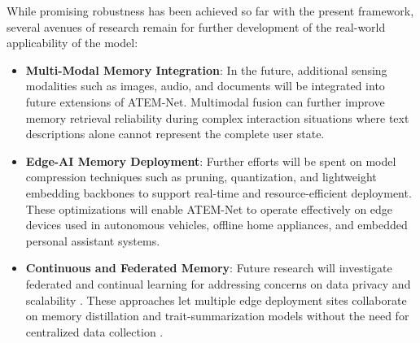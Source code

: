\documentclass[conference]{IEEEtran}
\begin{document}
While promising robustness has been achieved so far with the present framework, several avenues of research remain for further development of the real-world applicability of the model:
\begin{itemize}
    \item \textbf{Multi-Modal Memory Integration}: In the future, additional sensing modalities such as images, audio, and documents will be integrated into future extensions of ATEM-Net. Multimodal fusion can further improve memory retrieval reliability during complex interaction situations where text descriptions alone cannot represent the complete user state.
    \item \textbf{Edge-AI Memory Deployment}: Further efforts will be spent on model compression techniques such as pruning, quantization, and lightweight embedding backbones to support real-time and resource-efficient deployment. These optimizations will enable ATEM-Net to operate effectively on edge devices used in autonomous vehicles, offline home appliances, and embedded personal assistant systems.
    \item \textbf{Continuous and Federated Memory}: Future research will investigate federated and continual learning for addressing concerns on data privacy and scalability \cite{serra}. These approaches let multiple edge deployment sites collaborate on memory distillation and trait-summarization models without the need for centralized data collection \cite{thompson}.
\end{itemize}
\end{document}
